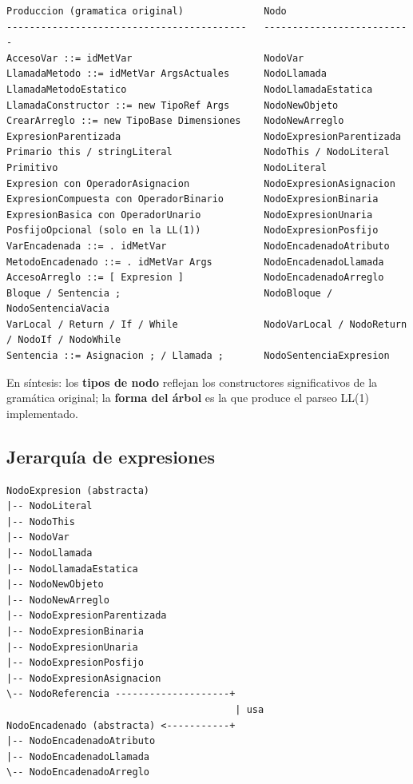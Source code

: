 \documentclass[11pt,a4paper]{article}
\begin{document}
{\footnotesize
\begin{verbatim}
Produccion (gramatica original)              Nodo
------------------------------------------   --------------------------
AccesoVar ::= idMetVar                       NodoVar
LlamadaMetodo ::= idMetVar ArgsActuales      NodoLlamada
LlamadaMetodoEstatico                        NodoLlamadaEstatica
LlamadaConstructor ::= new TipoRef Args      NodoNewObjeto
CrearArreglo ::= new TipoBase Dimensiones    NodoNewArreglo
ExpresionParentizada                         NodoExpresionParentizada
Primario this / stringLiteral                NodoThis / NodoLiteral
Primitivo                                    NodoLiteral
Expresion con OperadorAsignacion             NodoExpresionAsignacion
ExpresionCompuesta con OperadorBinario       NodoExpresionBinaria
ExpresionBasica con OperadorUnario           NodoExpresionUnaria
PosfijoOpcional (solo en la LL(1))           NodoExpresionPosfijo
VarEncadenada ::= . idMetVar                 NodoEncadenadoAtributo
MetodoEncadenado ::= . idMetVar Args         NodoEncadenadoLlamada
AccesoArreglo ::= [ Expresion ]              NodoEncadenadoArreglo
Bloque / Sentencia ;                         NodoBloque / NodoSentenciaVacia
VarLocal / Return / If / While               NodoVarLocal / NodoReturn / NodoIf / NodoWhile
Sentencia ::= Asignacion ; / Llamada ;       NodoSentenciaExpresion
\end{verbatim}
}

En síntesis: los \textbf{tipos de nodo} reflejan los constructores significativos
de la gramática original; la \textbf{forma del árbol} es la que produce el parseo
LL(1) implementado.

\subsection{Jerarquía de expresiones}

{\footnotesize
\begin{verbatim}
NodoExpresion (abstracta)
|-- NodoLiteral
|-- NodoThis
|-- NodoVar
|-- NodoLlamada
|-- NodoLlamadaEstatica
|-- NodoNewObjeto
|-- NodoNewArreglo
|-- NodoExpresionParentizada
|-- NodoExpresionBinaria
|-- NodoExpresionUnaria
|-- NodoExpresionPosfijo
|-- NodoExpresionAsignacion
\-- NodoReferencia --------------------+
                                        | usa
NodoEncadenado (abstracta) <-----------+
|-- NodoEncadenadoAtributo
|-- NodoEncadenadoLlamada
\-- NodoEncadenadoArreglo
\end{verbatim}
}
\end{document}
